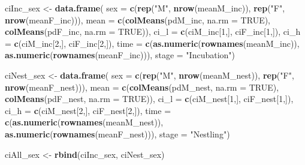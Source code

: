 \documentclass[]{article}
\newenvironment{Shaded}{\begin{snugshade}}{\end{snugshade}}
\newcommand{\DataTypeTok}[1]{\textcolor[rgb]{0.13,0.29,0.53}{#1}}
\newcommand{\DecValTok}[1]{\textcolor[rgb]{0.00,0.00,0.81}{#1}}
\newcommand{\KeywordTok}[1]{\textcolor[rgb]{0.13,0.29,0.53}{\textbf{#1}}}
\newcommand{\NormalTok}[1]{#1}
\newcommand{\OtherTok}[1]{\textcolor[rgb]{0.56,0.35,0.01}{#1}}
\newcommand{\StringTok}[1]{\textcolor[rgb]{0.31,0.60,0.02}{#1}}
\begin{document}
\begin{Shaded}
\begin{Highlighting}[]
\NormalTok{ciInc_sex <-}\StringTok{ }\KeywordTok{data.frame}\NormalTok{(}
    \DataTypeTok{sex =} \KeywordTok{c}\NormalTok{(}\KeywordTok{rep}\NormalTok{(}\StringTok{"M"}\NormalTok{, }\KeywordTok{nrow}\NormalTok{(meanM_inc)), }\KeywordTok{rep}\NormalTok{(}\StringTok{"F"}\NormalTok{, }\KeywordTok{nrow}\NormalTok{(meanF_inc))),}
    \DataTypeTok{mean =} \KeywordTok{c}\NormalTok{(}\KeywordTok{colMeans}\NormalTok{(pdM_inc, }\DataTypeTok{na.rm =} \OtherTok{TRUE}\NormalTok{), }\KeywordTok{colMeans}\NormalTok{(pdF_inc, }\DataTypeTok{na.rm =} \OtherTok{TRUE}\NormalTok{)),}
    \DataTypeTok{ci_l =} \KeywordTok{c}\NormalTok{(ciM_inc[}\DecValTok{1}\NormalTok{,], ciF_inc[}\DecValTok{1}\NormalTok{,]),}
    \DataTypeTok{ci_h =} \KeywordTok{c}\NormalTok{(ciM_inc[}\DecValTok{2}\NormalTok{,], ciF_inc[}\DecValTok{2}\NormalTok{,]),}
    \DataTypeTok{time =} \KeywordTok{c}\NormalTok{(}\KeywordTok{as.numeric}\NormalTok{(}\KeywordTok{rownames}\NormalTok{(meanM_inc)), }\KeywordTok{as.numeric}\NormalTok{(}\KeywordTok{rownames}\NormalTok{(meanF_inc))),}
    \DataTypeTok{stage =} \StringTok{"Incubation"}\NormalTok{)}


\NormalTok{ciNest_sex <-}\StringTok{ }\KeywordTok{data.frame}\NormalTok{(}
    \DataTypeTok{sex =} \KeywordTok{c}\NormalTok{(}\KeywordTok{rep}\NormalTok{(}\StringTok{"M"}\NormalTok{, }\KeywordTok{nrow}\NormalTok{(meanM_nest)), }\KeywordTok{rep}\NormalTok{(}\StringTok{"F"}\NormalTok{, }\KeywordTok{nrow}\NormalTok{(meanF_nest))),}
    \DataTypeTok{mean =} \KeywordTok{c}\NormalTok{(}\KeywordTok{colMeans}\NormalTok{(pdM_nest, }\DataTypeTok{na.rm =} \OtherTok{TRUE}\NormalTok{), }\KeywordTok{colMeans}\NormalTok{(pdF_nest, }\DataTypeTok{na.rm =} \OtherTok{TRUE}\NormalTok{)),}
    \DataTypeTok{ci_l =} \KeywordTok{c}\NormalTok{(ciM_nest[}\DecValTok{1}\NormalTok{,], ciF_nest[}\DecValTok{1}\NormalTok{,]),}
    \DataTypeTok{ci_h =} \KeywordTok{c}\NormalTok{(ciM_nest[}\DecValTok{2}\NormalTok{,], ciF_nest[}\DecValTok{2}\NormalTok{,]),}
    \DataTypeTok{time =} \KeywordTok{c}\NormalTok{(}\KeywordTok{as.numeric}\NormalTok{(}\KeywordTok{rownames}\NormalTok{(meanM_nest)), }\KeywordTok{as.numeric}\NormalTok{(}\KeywordTok{rownames}\NormalTok{(meanF_nest))),}
    \DataTypeTok{stage =} \StringTok{"Nestling"}\NormalTok{)}
    
\NormalTok{ciAll_sex <-}\StringTok{ }\KeywordTok{rbind}\NormalTok{(ciInc_sex, ciNest_sex)}
\end{Highlighting}
\end{Shaded}
\end{document}
